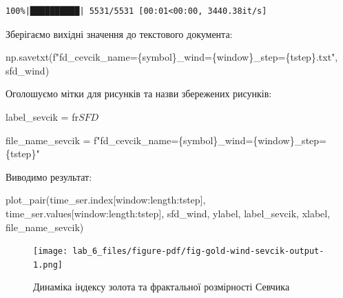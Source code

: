 \documentclass[
  letterpaper,
]{report}
\newenvironment{Shaded}{\begin{snugshade}}{\end{snugshade}}
\newcommand{\NormalTok}[1]{\textcolor[rgb]{0.00,0.23,0.31}{#1}}
\newcommand{\OperatorTok}[1]{\textcolor[rgb]{0.37,0.37,0.37}{#1}}
\newcommand{\SpecialCharTok}[1]{\textcolor[rgb]{0.37,0.37,0.37}{#1}}
\newcommand{\SpecialStringTok}[1]{\textcolor[rgb]{0.13,0.47,0.30}{#1}}
\newcommand{\VerbatimStringTok}[1]{\textcolor[rgb]{0.13,0.47,0.30}{#1}}
\begin{document}
\begin{verbatim}
100%|██████████| 5531/5531 [00:01<00:00, 3440.38it/s]
\end{verbatim}

Зберігаємо вихідні значення до текстового документа:

\begin{Shaded}
\begin{Highlighting}[]
\NormalTok{np.savetxt(}\SpecialStringTok{f"fd\_cevcik\_name=}\SpecialCharTok{\{}\NormalTok{symbol}\SpecialCharTok{\}}\SpecialStringTok{\_wind=}\SpecialCharTok{\{}\NormalTok{window}\SpecialCharTok{\}}\SpecialStringTok{\_step=}\SpecialCharTok{\{}\NormalTok{tstep}\SpecialCharTok{\}}\SpecialStringTok{.txt"}\NormalTok{, sfd\_wind)}
\end{Highlighting}
\end{Shaded}

Оголошуємо мітки для рисунків та назви збережених рисунків:

\begin{Shaded}
\begin{Highlighting}[]
\NormalTok{label\_sevcik }\OperatorTok{=} \VerbatimStringTok{fr\textquotesingle{}$SFD$\textquotesingle{}}

\NormalTok{file\_name\_sevcik }\OperatorTok{=} \SpecialStringTok{f"fd\_cevcik\_name=}\SpecialCharTok{\{}\NormalTok{symbol}\SpecialCharTok{\}}\SpecialStringTok{\_wind=}\SpecialCharTok{\{}\NormalTok{window}\SpecialCharTok{\}}\SpecialStringTok{\_step=}\SpecialCharTok{\{}\NormalTok{tstep}\SpecialCharTok{\}}\SpecialStringTok{"}
\end{Highlighting}
\end{Shaded}

Виводимо результат:

\begin{Shaded}
\begin{Highlighting}[]
\NormalTok{plot\_pair(time\_ser.index[window:length:tstep],}
\NormalTok{          time\_ser.values[window:length:tstep],}
\NormalTok{          sfd\_wind, }
\NormalTok{          ylabel, }
\NormalTok{          label\_sevcik,}
\NormalTok{          xlabel,}
\NormalTok{          file\_name\_sevcik)}
\end{Highlighting}
\end{Shaded}

\begin{figure}[H]

{\centering \texttt{[image: lab\_6\_files/figure-pdf/fig-gold-wind-sevcik-output-1.png]}

}

\caption{\label{fig-gold-wind-sevcik}Динаміка індексу золота та
фрактальної розмірності Севчика}

\end{figure}
\end{document}

